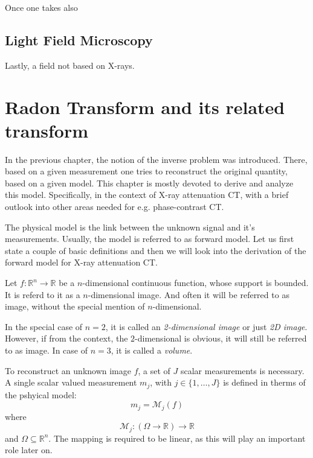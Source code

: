 Once one takes also

\section{Light Field Microscopy}\label{sec:lightfield_microscopy}

Lastly, a field not based on X-rays.


\chapter{Radon Transform and its related transform}\label{chap:radon_transform_and_related}

In the previous chapter, the notion of the inverse problem was introduced. There, based on a given
measurement one tries to reconstruct the original quantity, based on a given model. This chapter is
mostly devoted to derive and analyze this model. Specifically, in the context of X-ray attenuation
CT, with a brief outlook into other areas needed for e.g. phase-contrast CT.

The physical model is the link between the unknown signal and it's measurements. Usually, the model
is referred to as forward model. Let us first state a couple of basic definitions and then we will
look into the derivation of the forward model for X-ray attenuation CT.

\begin{definition}[Image]\label{def:image}
	Let \(f\colon \mathbb{R}^n \to \mathbb{R}\) be a \(n\)-dimensional continuous function, whose support is
	bounded. It is referd to it as a \(n\)-dimensional image. And often it will be referred to as image,
	without the special mention of \(n\)-dimensional.
\end{definition}


In the special case of \(n=2\), it is called an \textit{2-dimensional image} or just
\textit{2D image}. However, if from the context, the \(2\)-dimensional is obvious, it will still be
referred to as image. In case of \(n=3\), it is called a \textit{volume}.

\begin{definition}\label{def:forward-model}
	To reconstruct an unknown image \(f\), a set of \(J\) scalar measurements is necessary.
	A single scalar valued measurement \(m_j\), with \(j \in \{1, \dots, J\}\) is defined in therms
	of the pshyical model:
	\[ m_j = \mathscr{M}_j(f)\]
	where
	\[ \mathscr{M}_j\colon (\Omega \to \mathbb{R}) \to \mathbb{R} \]
	and \(\Omega \subseteq \mathbb{R}^n\). The mapping is required to be linear, as this will play an
	important role later on.
\end{definition}

